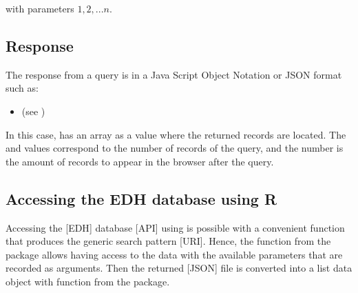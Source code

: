 \documentclass[a4paper,12pt,english]{sphinxhowto}
\begin{document}
with parameters  \(1,2,...n\).



\subsection{Response}
\label{\detokenize{Epigraphic:response}}
The response from a query is in a Java Script Object Notation or JSON format such as:

\begin{sphinxVerbatim}[commandchars=\\\{\},formatcom=\footnotesize]
     
     
     \PYG{p}{[}  \PYG{p}{]}
\end{sphinxVerbatim}
\begin{itemize}
\item {} 
(see {\hyperref[\detokenize{DDHH:json-str}]{}})

\end{itemize}

In this case,  has an array as a value where the returned records are located. The 
and  values correspond to the  number of records of the query, and the  number is
the amount of records to appear in the browser after the query.



\subsection{Accessing the EDH database using R}
\label{\detokenize{Epigraphic:accessing-the-edh-database-using-r}}
Accessing the {[}EDH{]} database {[}API{]} using  is possible with a convenient function that produces
the generic search pattern {[}URI{]}. Hence, the function  from the  package allows
having access to the data with the available parameters that are recorded as arguments. Then the
returned {[}JSON{]} file is converted into a list data object with function  from the
 package.
\end{document}
